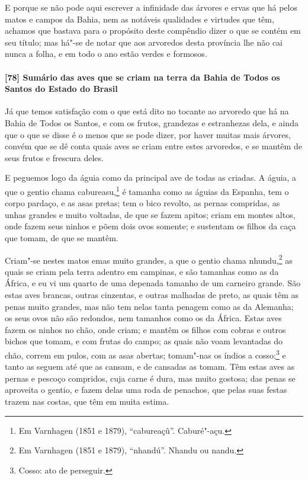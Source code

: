 E porque se não pode aqui escrever a infinidade das árvores e ervas que há pelos matos e
campos da Bahia, nem as notáveis qualidades e virtudes que têm, achamos que bastava para o
propósito deste compêndio dizer o que se contém em seu título; mas há"-se de notar que aos
arvoredos desta província lhe não cai nunca a folha, e em todo o ano estão verdes e
formosos.

\paragraph{[78] Sumário das aves que se criam na terra da Bahia de Todos os Santos do Estado
do Brasil}\quad
Já que temos satisfação com o que está dito no tocante ao arvoredo que há na Bahia de
Todos os Santos, e com os frutos, grandezas e estranhezas dela, e ainda que o que se disse
é o menos que se pode dizer, por haver muitas mais árvores, convém que se dê conta quais
aves se criam entre estes arvoredos, e se mantêm de seus frutos e frescura deles.

E peguemos logo da águia como da principal ave de todas as criadas. A águia, a que o
gentio chama cabureasu,\footnote{ Em Varnhagen (1851 e 1879), ``cabureaçû''. Caburé"-açu.}
é tamanha como as águias da Espanha, tem o corpo pardaço, e as asas pretas; tem o bico
revolto, as pernas compridas, as unhas grandes e muito voltadas, de que se fazem apitos;
criam em montes altos, onde fazem seus ninhos e põem dois ovos somente; e sustentam os
filhos da caça que tomam, de que se mantêm.

Criam"-se nestes matos emas muito grandes, a que o gentio chama nhundu,\footnote{ Em
Varnhagen (1851 e 1879), ``nhandú''. Nhandu ou nandu.} as quais se criam pela terra
adentro em campinas, e são tamanhas como as da África, e eu vi um quarto de uma depenada
tamanho de um carneiro grande. São estas aves brancas, outras cinzentas, e outras malhadas
de preto, as quais têm as penas muito grandes, mas não tem nelas tanta penagem como as da
Alemanha; os seus ovos não são redondos, nem tamanhos como os da África. Estas aves fazem
os ninhos no chão, onde criam; e mantêm os filhos com cobras e outros bichos que tomam, e
com frutas do campo; as quais não voam levantadas do chão, correm em pulos, com as asas
abertas; tomam"-nas os índios a cosso;\footnote{ Cosso: ato de perseguir.} e tanto as
seguem até que as cansam, e de cansadas as tomam. Têm estas aves as pernas e
pescoço compridos, cuja carne é dura, mas muito gostosa; das penas se aproveita o gentio,
e fazem delas uma roda de penachos, que pelas suas festas trazem nas costas, que têm em
muita estima.

